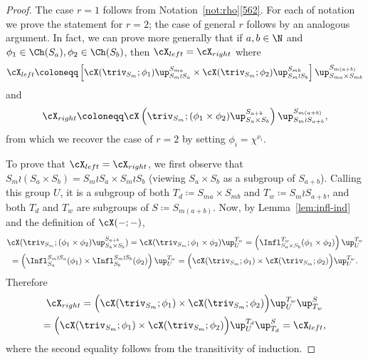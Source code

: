 \begin{proof}
	The case $r=1$ follows from Notation~\ref{not:rho}\ref{562}. For each of notation we prove the statement for $r=2$; the case of general $r$ follows by an analogous argument. In fact, we can prove more generally that if $a,b\in\N$ and $\phi_1\in\Ch(S_a), \phi_2\in\Ch(S_b)$, then $\cX_{left}=\cX_{right}$ where
	\[ \cX_{left}\coloneqq  \left[\cX(\triv_{S_m}; \phi_1)\up_{S_m\wr S_a}^{S_{ma}} \times \cX(\triv_{S_m}; \phi_2)\up_{S_m\wr S_b}^{S_{mb}}\right]\up_{S_{ma}\times S_{mb}}^{S_{m(a+b)}} \]
	and
	\[ \cX_{right}\coloneqq  \cX\left(\triv_{S_m}; (\phi_1\times \phi_2)\up_{S_a\times S_b}^{S_{a+b}}\right)\up_{S_m\wr S_{a+b}}^{S_{m(a+b)}}, \]
	from which we recover the case of $r=2$ by setting $\phi_i=\chi^{\nu_i}$. 
	
	To prove that $\cX_{left}=\cX_{right}$, we first observe that $S_m\wr(S_a\times S_b) = S_m\wr S_a \times S_m\wr S_b$ (viewing $S_a\times S_b$ as a subgroup of $S_{a+b}$). Calling this group $U$, it is a subgroup of both $T_d\coloneqq S_{ma}\times S_{mb}$ and $T_w\coloneqq S_m\wr S_{a+b}$, and both $T_d$ and $T_w$ are subgroups of $S\coloneqq S_{m(a+b)}$. Now, by Lemma~\ref{lem:infl-ind} and the definition of $\cX(-;-)$,
	\begin{multline*}
		\cX(\triv_{S_m}; (\phi_1 \times \phi_2)\up_{S_a\times S_b}^{S_{a+b}}) = \cX(\triv_{S_m}; \phi_1\times\phi_2)\up_U^{T_w} = \left(\Infl_{S_a\times S_b}^{T_w}(\phi_1\times\phi_2)\right)\up_U^{T_w}\\
		= \left( \Infl_{S_a}^{S_m\wr S_a}(\phi_1)\times \Infl_{S_b}^{S_m\wr S_b}(\phi_2) \right)\up_U^{T_w} = \Big( \cX(\triv_{S_m};\phi_1)\times \cX(\triv_{S_m};\phi_2) \Big)\up_U^{T_w}.
	\end{multline*}
	Therefore
	\begin{multline*}
	 	\cX_{right} = \Big( \cX(\triv_{S_m};\phi_1)\times \cX(\triv_{S_m};\phi_2) \Big)\up_U^{T_w} \up_{T_w}^S \\
	 	= \Big( \cX(\triv_{S_m};\phi_1)\times \cX(\triv_{S_m};\phi_2) \Big)\up_U^{T_d} \up_{T_d}^S = \cX_{left},
	 \end{multline*}
	where the second equality follows from the transitivity of induction.
\end{proof}
